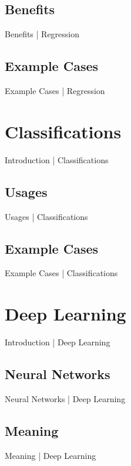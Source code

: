 \documentclass[10pt]{beamer}
\begin{document}
		\subsection{Benefits}
			\begin{frame}{Benefits | Regression}
			\end{frame}
		\subsection{Example Cases}
			\begin{frame}{Example Cases | Regression}
			\end{frame}
	
	\section{Classifications}
		\begin{frame}{Introduction | Classifications}
		\end{frame}
		\subsection{Usages}
			\begin{frame}{Usages | Classifications}
			\end{frame}
		\subsection{Example Cases}
			\begin{frame}{Example Cases | Classifications}
			\end{frame}
	
	
	\section{Deep Learning}
		\begin{frame}{Introduction | Deep Learning}
		\end{frame}
		\subsection{Neural Networks}
			\begin{frame}{Neural Networks | Deep Learning}
			\end{frame}
		\subsection{Meaning}
			\begin{frame}{Meaning | Deep Learning}
			\end{frame}
\end{document}
